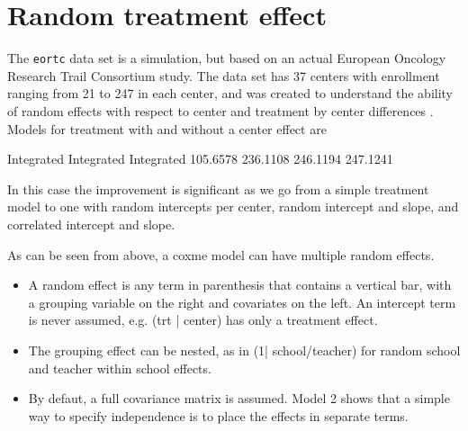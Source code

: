 \documentclass{article}
\begin{document}
\section{Random treatment effect}
The \texttt{eortc} data set is a simulation, but based on an actual European
Oncology Research Trail Consortium study.  The data set has 37 centers
with enrollment ranging from 21 to 247 in each center, and was created to
understand the ability of random effects with respect to center and
treatment by center differences \cite{cortinas}.
Models for treatment with and without a center effect are
\begin{Schunk}
\begin{Soutput}
           Integrated Integrated Integrated 
  105.6578   236.1108   246.1194   247.1241 
\end{Soutput}
\end{Schunk}
In this case the improvement is significant as we go from a simple
treatment model to one with random intercepts per center,
random intercept and slope, and correlated intercept and slope.

As can be seen from above, a coxme model can have multiple
random effects.
\begin{itemize}
  \item A random effect is any term in parenthesis that contains
    a vertical bar, with a grouping variable on the right and 
    covariates on the left.  An intercept term is never
    assumed, e.g. (trt | center) has only a treatment effect.
  \item The grouping effect can be nested, as in (1| school/teacher)
    for random school and teacher within school effects.
  \item By defaut, a full covariance matrix is assumed.  Model 2
    shows that a simple way to specify independence is to
    place the effects in separate terms.
\end{itemize}
\end{document}
